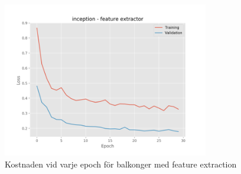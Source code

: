 \documentclass[]{kththesis}
\begin{document}
\begin{figure}[h]
    \includegraphics[width=9cm]{b_l_inception_fe}
    \caption{Kostnaden vid varje epoch för balkonger med feature extraction}
    \label{fig:b_l_1}
  \end{figure}
  
\end{document}
